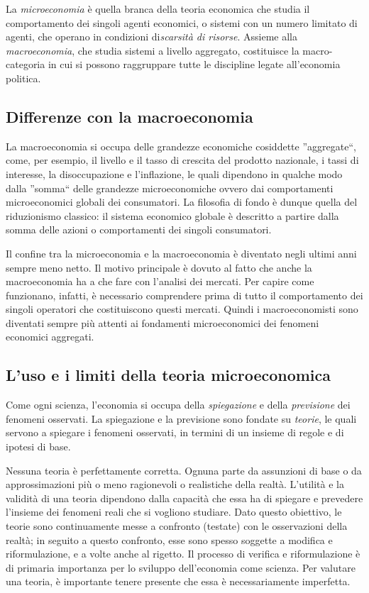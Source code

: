 La \emph{microeconomia} è quella branca della teoria economica che studia il 
comportamento dei singoli agenti economici, o sistemi con un numero limitato 
di agenti, che operano in condizioni di\emph{scarsità di risorse}. Assieme 
alla \emph{macroeconomia}, che studia sistemi a livello aggregato, 
costituisce la macro-categoria in cui si possono raggruppare tutte le 
discipline legate all'economia politica.

\subsection{Differenze con la macroeconomia}

La macroeconomia si 
occupa delle grandezze economiche cosiddette ''aggregate``, come, per 
esempio, il livello e il tasso di crescita del prodotto nazionale, i tassi di 
interesse, la disoccupazione e l'inflazione, le quali dipendono in 
qualche modo dalla ''somma`` delle grandezze microeconomiche ovvero dai 
comportamenti microeconomici globali dei consumatori. La filosofia di fondo è 
dunque quella del riduzionismo classico: il sistema economico globale è 
descritto a partire dalla somma delle azioni o comportamenti dei singoli 
consumatori.

Il confine tra la microeconomia e la macroeconomia è diventato negli ultimi 
anni sempre meno netto. Il motivo principale è dovuto al fatto che anche la 
macroeconomia ha a che fare con l'analisi dei mercati. Per capire come 
funzionano, infatti, è necessario comprendere prima di tutto il comportamento 
dei singoli operatori che costituiscono questi mercati. Quindi i 
macroeconomisti sono diventati sempre più attenti ai 
fondamenti microeconomici dei fenomeni economici aggregati.

\subsection{L'uso e i limiti della teoria microeconomica}

Come ogni scienza, l'economia si occupa della \emph{spiegazione} e della 
\emph{previsione} dei fenomeni osservati. La spiegazione e la previsione sono 
fondate su \emph{teorie}, le quali servono a spiegare i fenomeni osservati, 
in termini di un insieme di regole e di ipotesi di base. 

Nessuna teoria è perfettamente corretta. Ognuna parte da assunzioni di base o 
da approssimazioni più o meno ragionevoli o realistiche della realtà. 
L'utilità e la validità di una teoria dipendono dalla capacità che essa ha di 
spiegare e prevedere l'insieme dei fenomeni reali che si vogliono studiare. 
Dato questo obiettivo, le teorie sono continuamente messe a confronto 
(testate) con le osservazioni della realtà; in seguito a questo confronto, 
esse sono spesso soggette a modifica e riformulazione, e a volte anche al 
rigetto. 
Il processo di verifica e riformulazione è di primaria importanza per lo 
sviluppo dell'economia come scienza. Per valutare una teoria, è importante 
tenere presente che essa è necessariamente imperfetta.

